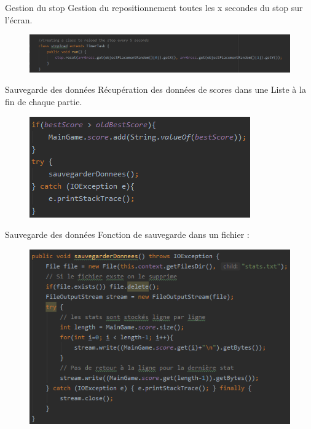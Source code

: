 \documentclass{beamer}
\begin{document}
%
\begin{frame}{Gestion du stop}
Gestion du repositionnement toutes les x secondes du stop sur l'écran.
\begin{figure}
        \includegraphics[scale=0.5]{stoptimer.png}
    \end{figure}
\end{frame}
%
\begin{frame}{Sauvegarde des données}
    Récupération des données de scores dans une Liste à la fin de chaque partie.
    \begin{figure}
        \includegraphics[scale=0.8]{SaveGameOver.png}
    \end{figure}
\end{frame}

\begin{frame}{Sauvegarde des données}
    Fonction de sauvegarde dans un fichier :
    \begin{figure}
        \centering
        \includegraphics[scale=0.6]{SaveData.png}
    \end{figure}
\end{frame}
\end{document}

